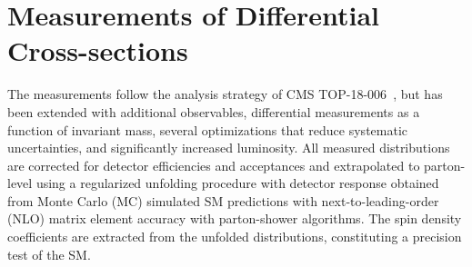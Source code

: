 

\chapter{Measurements of Differential Cross-sections}
\label{Measurements_of_Differential_Cross-sections}
The measurements follow the analysis strategy of CMS TOP-18-006~\cite{Sirunyan:2681777}, but has been extended with additional observables, differential measurements as a function of \ttbar invariant mass, several optimizations that reduce systematic uncertainties, and significantly increased luminosity.
All measured distributions are corrected for detector efficiencies and acceptances and extrapolated to parton-level using a regularized unfolding procedure with detector response obtained from Monte Carlo (MC) simulated SM predictions with next-to-leading-order (NLO) matrix element accuracy with parton-shower algorithms.
The spin density coefficients are extracted from the unfolded distributions, constituting a precision test of the SM.

